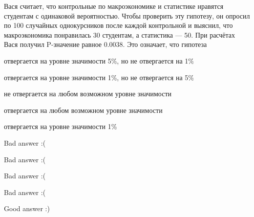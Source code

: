 
\begin{question}
Вася считает, что контрольные по макроэкономике и статистике нравятся
студентам с одинаковой вероятностью. Чтобы проверить эту гипотезу, он
опросил по 100 случайных однокурсников после каждой контрольной и
выяснил, что макроэкономика понравилась 30 студентам, а статистика ---
50. При расчётах Вася получил P-значение равное 0.0038. Это означает,
что гипотеза
\begin{answerlist}[2]
  \item отвергается на уровне значимости 5\%, но не отвергается на 1\%
  \item отвергается на уровне значимости 1\%, но не отвергается на 5\%
  \item не отвергается на любом возможном уровне значимости
  \item отвергается на любом возможном уровне значимости
  \item отвергается на уровне значимости 1\%
\end{answerlist}
\end{question}

\begin{solution}
\begin{answerlist}
  \item Bad answer :(
  \item Bad answer :(
  \item Bad answer :(
  \item Bad answer :(
  \item Good answer :)
\end{answerlist}
\end{solution}


